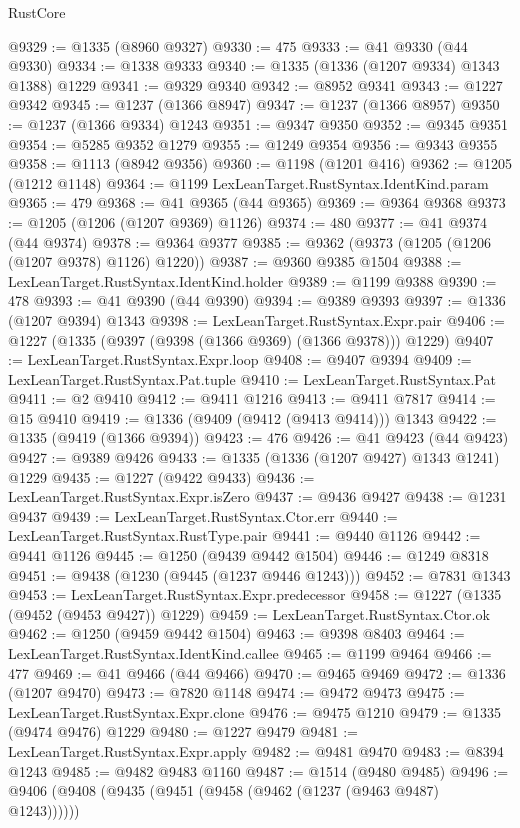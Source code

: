 \begin{lexlean}{RustCore}
\begin{coremodule}
@9329 := @1335 (@8960 @9327)
@9330 := 475
@9333 := @41 @9330 (@44 @9330)
@9334 := @1338 @9333
@9340 := @1335 (@1336 (@1207 @9334) @1343 @1388) @1229
@9341 := @9329 @9340
@9342 := @8952 @9341
@9343 := @1227 @9342
@9345 := @1237 (@1366 @8947)
@9347 := @1237 (@1366 @8957)
@9350 := @1237 (@1366 @9334) @1243
@9351 := @9347 @9350
@9352 := @9345 @9351
@9354 := @5285 @9352 @1279
@9355 := @1249 @9354
@9356 := @9343 @9355
@9358 := @1113 (@8942 @9356)
@9360 := @1198 (@1201 @416)
@9362 := @1205 (@1212 @1148)
@9364 := @1199 LexLeanTarget.RustSyntax.IdentKind.param
@9365 := 479
@9368 := @41 @9365 (@44 @9365)
@9369 := @9364 @9368
@9373 := @1205 (@1206 (@1207 @9369) @1126)
@9374 := 480
@9377 := @41 @9374 (@44 @9374)
@9378 := @9364 @9377
@9385 := @9362 (@9373 (@1205 (@1206 (@1207 @9378) @1126) @1220))
@9387 := @9360 @9385 @1504
@9388 := LexLeanTarget.RustSyntax.IdentKind.holder
@9389 := @1199 @9388
@9390 := 478
@9393 := @41 @9390 (@44 @9390)
@9394 := @9389 @9393
@9397 := @1336 (@1207 @9394) @1343
@9398 := LexLeanTarget.RustSyntax.Expr.pair
@9406 := @1227 (@1335 (@9397 (@9398 (@1366 @9369) (@1366 @9378))) @1229)
@9407 := LexLeanTarget.RustSyntax.Expr.loop
@9408 := @9407 @9394
@9409 := LexLeanTarget.RustSyntax.Pat.tuple
@9410 := LexLeanTarget.RustSyntax.Pat
@9411 := @2 @9410
@9412 := @9411 @1216
@9413 := @9411 @7817
@9414 := @15 @9410
@9419 := @1336 (@9409 (@9412 (@9413 @9414))) @1343
@9422 := @1335 (@9419 (@1366 @9394))
@9423 := 476
@9426 := @41 @9423 (@44 @9423)
@9427 := @9389 @9426
@9433 := @1335 (@1336 (@1207 @9427) @1343 @1241) @1229
@9435 := @1227 (@9422 @9433)
@9436 := LexLeanTarget.RustSyntax.Expr.isZero
@9437 := @9436 @9427
@9438 := @1231 @9437
@9439 := LexLeanTarget.RustSyntax.Ctor.err
@9440 := LexLeanTarget.RustSyntax.RustType.pair
@9441 := @9440 @1126
@9442 := @9441 @1126
@9445 := @1250 (@9439 @9442 @1504)
@9446 := @1249 @8318
@9451 := @9438 (@1230 (@9445 (@1237 @9446 @1243)))
@9452 := @7831 @1343
@9453 := LexLeanTarget.RustSyntax.Expr.predecessor
@9458 := @1227 (@1335 (@9452 (@9453 @9427)) @1229)
@9459 := LexLeanTarget.RustSyntax.Ctor.ok
@9462 := @1250 (@9459 @9442 @1504)
@9463 := @9398 @8403
@9464 := LexLeanTarget.RustSyntax.IdentKind.callee
@9465 := @1199 @9464
@9466 := 477
@9469 := @41 @9466 (@44 @9466)
@9470 := @9465 @9469
@9472 := @1336 (@1207 @9470)
@9473 := @7820 @1148
@9474 := @9472 @9473
@9475 := LexLeanTarget.RustSyntax.Expr.clone
@9476 := @9475 @1210
@9479 := @1335 (@9474 @9476) @1229
@9480 := @1227 @9479
@9481 := LexLeanTarget.RustSyntax.Expr.apply
@9482 := @9481 @9470
@9483 := @8394 @1243
@9485 := @9482 @9483 @1160
@9487 := @1514 (@9480 @9485)
@9496 := @9406 (@9408 (@9435 (@9451 (@9458 (@9462 (@1237 (@9463 @9487) @1243))))))

\end{coremodule}
\end{lexlean}
